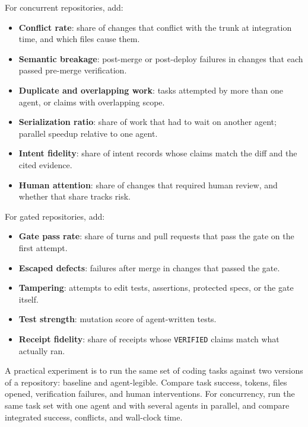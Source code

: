 \documentclass[11pt]{article}
\begin{document}
For concurrent repositories, add:

\begin{itemize}[leftmargin=*]
  \item \textbf{Conflict rate}: share of changes that conflict with the trunk at integration time, and which files cause them.
  \item \textbf{Semantic breakage}: post-merge or post-deploy failures in changes that each passed pre-merge verification.
  \item \textbf{Duplicate and overlapping work}: tasks attempted by more than one agent, or claims with overlapping scope.
  \item \textbf{Serialization ratio}: share of work that had to wait on another agent; parallel speedup relative to one agent.
  \item \textbf{Intent fidelity}: share of intent records whose claims match the diff and the cited evidence.
  \item \textbf{Human attention}: share of changes that required human review, and whether that share tracks risk.
\end{itemize}

For gated repositories, add:

\begin{itemize}[leftmargin=*]
  \item \textbf{Gate pass rate}: share of turns and pull requests that pass the gate on the first attempt.
  \item \textbf{Escaped defects}: failures after merge in changes that passed the gate.
  \item \textbf{Tampering}: attempts to edit tests, assertions, protected specs, or the gate itself.
  \item \textbf{Test strength}: mutation score of agent-written tests.
  \item \textbf{Receipt fidelity}: share of receipts whose \texttt{VERIFIED} claims match what actually ran.
\end{itemize}

A practical experiment is to run the same set of coding tasks against two versions of a repository: baseline and agent-legible. Compare task success, tokens, files opened, verification failures, and human interventions. For concurrency, run the same task set with one agent and with several agents in parallel, and compare integrated success, conflicts, and wall-clock time.
\end{document}
